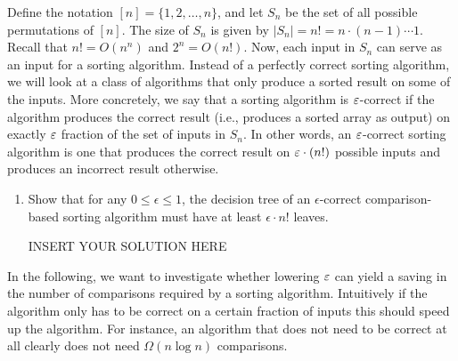 Define the notation $[n] = \{1, 2, \ldots, n\}$, and let $S_n$ be the set of all possible permutations of $[n]$. The size of $S_n$ is given by $|S_n|=n!=n\cdot (n-1) \cdots 1$. Recall that $n!=O(n^n)$ and $2^n=O(n!)$. 
Now, each input in $S_n$ can serve as an input for a sorting algorithm. Instead of a perfectly correct sorting algorithm, we will look at a class of algorithms that only produce a sorted result on some of the inputs. More concretely, we say that a sorting algorithm is $\varepsilon$-correct if the algorithm produces the correct result (i.e., produces a sorted array as output) on exactly $\varepsilon$ fraction of the set of inputs in $S_n$. In other words, an $\varepsilon$-correct sorting algorithm is one that produces the correct result on $\varepsilon \cdot (n!)$ possible inputs and produces an incorrect result otherwise.
\begin{enumerate}
    \item Show that for any $0\leq \epsilon\leq 1$, the decision tree of an $\epsilon$-correct comparison-based sorting algorithm must have at least $\epsilon \cdot n!$ leaves. 
\begin{solution}   INSERT YOUR SOLUTION HERE   \end{solution}
\end{enumerate}

\noindent
In the following, we want to investigate whether lowering $\varepsilon$ can yield a saving in the number of comparisons required by a sorting algorithm. Intuitively if the algorithm only has to be correct on a certain fraction of inputs this should speed up the algorithm. For instance, an algorithm that does not need to be correct at all clearly does not need $\Omega(n \log n)$ comparisons.  

